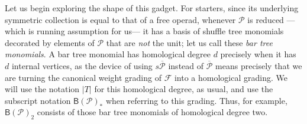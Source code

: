 \documentclass[fleqn, a4paper, twoside]{article}
\newcommand{\0}{\langle 0\rangle}
\newcommand{\FF}{\mathcal{F}}
\newcommand{\B}[1]{\mathsf{B}(#1)}
\DeclareRobustCommand{\[}{\begin{equation}}%
\DeclareRobustCommand{\]}{\end{equation}}%
\theoremstyle{mytheorem}
\theoremstyle{introthm}
\theoremstyle{mydefinition}
\theoremstyle{mydefinition2}
\theoremstyle{plain} %
\newcommand{\?}{\,?\,}
\newcommand{\PP}{{\mathcal{P}}}
\theoremstyle{mytheorem}
\theoremstyle{plain} %
\begin{document}
Let us begin exploring the shape of this gadget. For starters,
since its underlying symmetric collection is equal to that of
a free operad, whenever $\PP$ is reduced ---which is running
assumption for us--- it has a basis of shuffle tree monomials
decorated by elements of $\PP$ that are \emph{not} the unit;
let us call these \emph{bar tree monomials}. A bar tree monomial
has homological degree $d$ precisely when it has $d$ internal
vertices, as the device of using $s\overline{\PP}$ instead of
$\overline\PP$ means precisely that we are turning the canonical
weight grading of $\FF$ into a homological grading. We will
use the notation $|T|$ for this homological degree, as usual,
and use the subscript notation $\B{\PP}_*$ when referring to
this grading. Thus, for example,  $\B{\PP}_2$ consists of
those bar tree monomials of homological degree two.
\end{document}
